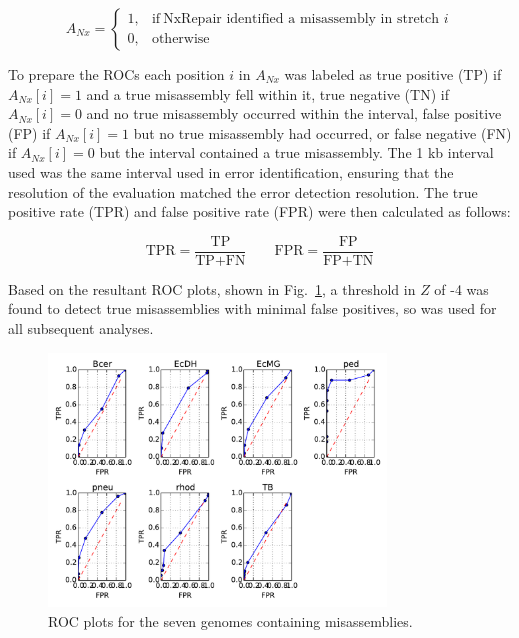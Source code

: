 \begin{equation}
    A_{Nx}=
    \begin{cases}
      1, & \text{if}\ \text{NxRepair identified a misassembly in stretch $i$} \\
      0, & \text{otherwise}
    \end{cases}
  \label{eq:found}
\end{equation}

To prepare the ROCs each position $i$ in $A_{Nx}$ was labeled as true positive (TP) if $A_{Nx}[i] = 1$ and a true misassembly fell within it, true negative (TN) if $A_{Nx}[i] = 0$ and no true misassembly occurred within the interval, false positive (FP) if $A_{Nx}[i] = 1$ but no true misassembly had occurred, or false negative (FN) if $A_{Nx}[i] = 0$ but the interval contained a true misassembly. The 1 kb interval used was the same interval used in error identification, ensuring that the resolution of the evaluation matched the error detection resolution. The true positive rate (TPR) and false positive rate (FPR) were then calculated as follows:

\begin{equation}
\text{TPR} = \frac{\text{TP}}{\text{TP} + \text{FN}} \qquad \text{FPR} = \frac{\text{FP}}{\text{FP} + \text{TN}}
\label{eq:tpr}
\end{equation}

Based on the resultant ROC plots, shown in Fig.~\ref{fig:ROCs}, a threshold in $Z$ of -4 was found to detect true misassemblies with minimal false positives, so was used for all subsequent analyses. 

\begin{figure}
\centerline{\includegraphics[width=0.8\textwidth]{illumina/allROC.pdf}}
\caption{ROC plots for the seven genomes containing misassemblies.\label{fig:ROCs}}
\end{figure}


